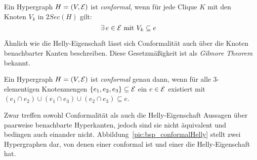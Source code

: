 \begin{mydef}\label{def:conformal}
    Ein Hypergraph $H=(V,\mathcal{E})$ ist \emph{conformal}, wenn für jede Clique $K$ mit den Knoten $V_k$ in $2Sec(H)$ gilt:
    \[ \exists\,e\in\mathcal{E}\text{ mit } V_k\subseteq e\]
\end{mydef}

Ähnlich wie die Helly-Eigenschaft lässt sich Conformalität auch über die Knoten benachbarter Kanten beschreiben. Diese Gesetzmäßigkeit ist als \emph{Gilmore Theorem} bekannt.

\begin{Theorem}\label{theo:GilmoreTheorem}\cite{berge1989hypergraphs}
    Ein Hypergraph $H=(V,\mathcal{E})$ ist \emph{conformal} genau dann, wenn für alle 3-elementigen Knotenmengen $\{ e_1, e_2, e_3 \} \subseteq \mathcal{E}$ ein $e \in \mathcal{E}$ existiert mit $(e_1 \cap e_2) \cup (e_1 \cap e_3) \cup (e_2 \cap e_3) \subseteq e$.
\end{Theorem}

Zwar treffen sowohl Conformalität als auch die Helly-Eigenschaft Aussagen über paarweise benachbarte Hyperkanten, jedoch sind sie nicht äquivalent und bedingen auch einander nicht. Abbildung~\ref{pic:bsp_conformalHelly} stellt zwei Hypergraphen dar, von denen einer conformal ist und einer die Helly-Eigenschaft hat.

